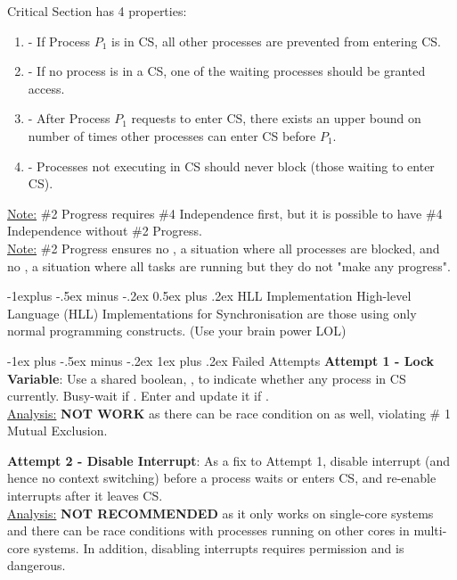 \documentclass[10pt,landscape,letterpaper]{article}
\makeatletter
\renewcommand{\subsection}{\@startsection{subsection}{2}{0mm}%
                                {-1explus -.5ex minus -.2ex}%
                                {0.5ex plus .2ex}%
                                {\sffamily\normalsize\itshape}}
\renewcommand{\subsubsection}{\@startsection{subsubsection}{3}{0mm}%
                                {-1ex plus -.5ex minus -.2ex}%
                                {1ex plus .2ex}%
                                {\normalfont\small\itshape}}
\makeatother
\begin{document}
\begin{multicols}{3}
\medskip

Critical Section has 4 properties:
\begin{enumerate}
    \item {} - If Process $P_1$ is in CS, all other processes are prevented from entering CS.
    \item {} - If no process is in a CS, one of the waiting processes should be granted access.
    \item {} - After Process $P_1$ requests to enter CS, there exists an upper bound on number of times other processes can enter CS before $P_1$.
    \item {} - Processes not executing in CS should never block (those waiting to enter CS).
\end{enumerate}
\underline{Note:} \#2 Progress requires \#4 Independence first, but it is possible to have \#4 Independence without \#2 Progress.
\\
\underline{Note:} \#2 Progress ensures no , a situation where all processes are blocked, and no , a situation where all tasks are running but they do not "make any progress".


\subsection{HLL Implementation}
High-level Language (HLL) Implementations for Synchronisation are those using only normal programming constructs. (Use your brain power LOL)


\subsubsection{Failed Attempts}
\textbf{Attempt 1 - Lock Variable}: Use a shared boolean, , to indicate whether any process in CS currently. Busy-wait if . Enter and update it if .
\\
\underline{Analysis:} \textbf{NOT WORK} as there can be race condition on  as well, violating \# 1 Mutual Exclusion.

\medskip

\textbf{Attempt 2 - Disable Interrupt}: As a fix to Attempt 1, disable interrupt (and hence no context switching) before a process waits or enters CS, and re-enable interrupts after it leaves CS.
\\
\underline{Analysis:} \textbf{NOT RECOMMENDED} as it only works on single-core systems and there can be race conditions with processes running on other cores in multi-core systems. In addition, disabling interrupts requires permission and is dangerous.


\end{multicols}
\end{document}

